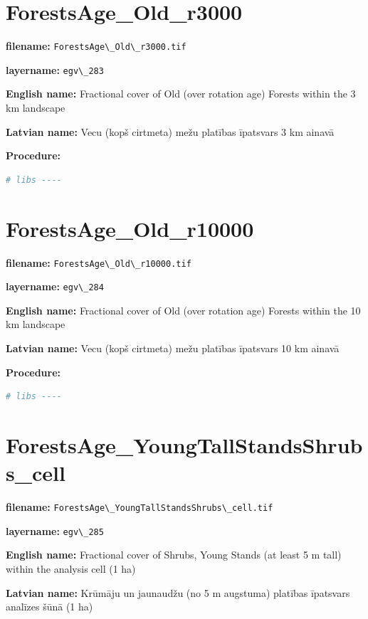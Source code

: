 \documentclass[
]{book}
\newcommand{\passthrough}[1]{#1}
\begin{document}
\section{ForestsAge\_Old\_r3000}\label{ch06.283}

\textbf{filename:} \passthrough{\lstinline!ForestsAge\_Old\_r3000.tif!}

\textbf{layername:} \passthrough{\lstinline!egv\_283!}

\textbf{English name:} Fractional cover of Old (over rotation age) Forests within the 3 km landscape

\textbf{Latvian name:} Vecu (kopš cirtmeta) mežu platības īpatsvars 3 km ainavā

\textbf{Procedure:}

\begin{lstlisting}[language=R]
# libs ----
\end{lstlisting}

\section{ForestsAge\_Old\_r10000}\label{ch06.284}

\textbf{filename:} \passthrough{\lstinline!ForestsAge\_Old\_r10000.tif!}

\textbf{layername:} \passthrough{\lstinline!egv\_284!}

\textbf{English name:} Fractional cover of Old (over rotation age) Forests within the 10 km landscape

\textbf{Latvian name:} Vecu (kopš cirtmeta) mežu platības īpatsvars 10 km ainavā

\textbf{Procedure:}

\begin{lstlisting}[language=R]
# libs ----
\end{lstlisting}

\section{ForestsAge\_YoungTallStandsShrubs\_cell}\label{ch06.285}

\textbf{filename:} \passthrough{\lstinline!ForestsAge\_YoungTallStandsShrubs\_cell.tif!}

\textbf{layername:} \passthrough{\lstinline!egv\_285!}

\textbf{English name:} Fractional cover of Shrubs, Young Stands (at least 5 m tall) within the analysis cell (1 ha)

\textbf{Latvian name:} Krūmāju un jaunaudžu (no 5 m augstuma) platības īpatsvars analīzes šūnā (1 ha)
\end{document}

